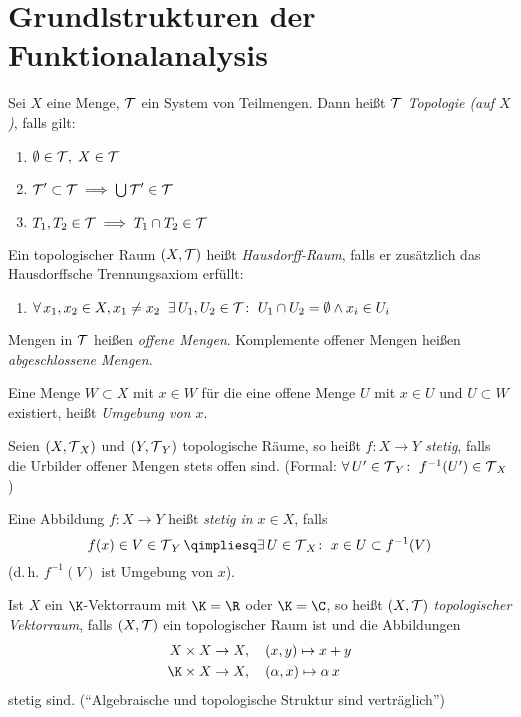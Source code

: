 \chapter{Grundlstrukturen der Funktionalanalysis}
\begin{thEmpty}[Topologie]
    Sei $X$ eine Menge, $\operatorname{\mathcal{T}}$ ein System von Teilmengen. Dann heißt $\operatorname{\mathcal{T}}$
    \emph{Topologie (auf $X$)}, falls gilt:
    \begin{enumerate}[({T}1),leftmargin=2cm]
        \item
            \quad $\emptyset\in\operatorname{\mathcal{T}},\;X\in\operatorname{\mathcal{T}}$
        \item
            \quad $\operatorname{\mathcal{T}}'\subset\operatorname{\mathcal{T}} \implies \bigcup \operatorname{\mathcal{T}}' \in \operatorname{\mathcal{T}}$
        \item
            \quad $T_1,T_2\in\operatorname{\mathcal{T}} \implies T_1\cap T_2\in\operatorname{\mathcal{T}}$
    \end{enumerate}

    Ein topologischer Raum $(X,\operatorname{\mathcal{T}})$ heißt \emph{Hausdorff-Raum}, falls er
    zusätzlich das Hausdorffsche Trennungsaxiom erfüllt:
    \begin{enumerate}[({T}4),leftmargin=2cm]
        \item
            \quad $\forall\, x_1,x_2\in X, x_1\neq x_2\;\; \exists\,
            U_1,U_2\in\operatorname{\mathcal{T}}\colon\; U_1\cap U_2=\emptyset \wedge x_i\in U_i$
    \end{enumerate}

    Mengen in $\operatorname{\mathcal{T}}$ heißen \emph{offene Mengen}. Komplemente offener Mengen heißen
    \emph{abgeschlossene Mengen}.

    Eine Menge $W\subset X$ mit $x\in W$ für die eine offene Menge $U$ mit $x\in U$
    und $U\subset W$ existiert, heißt \emph{Umgebung von $x$}.

    Seien $(X,\operatorname{\mathcal{T}}_X)$ und $(Y,\operatorname{\mathcal{T}}_Y)$ topologische Räume, so heißt 
    \emph{$f\colon X\to Y$ stetig}, falls die Urbilder offener Mengen stets offen sind.
    (Formal: $\forall\,U'\in\operatorname{\mathcal{T}}_Y\colon\; f^{-1}(U')\in\operatorname{\mathcal{T}}_X$)

    Eine Abbildung $f\colon X\to Y$ heißt \emph{stetig in $x\in X$}, falls
    \[ f(x)\in V\in\Topo_Y \qimpliesq \exists\,U\in\Topo_X\colon\; x\in U\subset
        f^{-1}(V)
    \]
    (d.\,h. $f^{-1}(V)$ ist Umgebung von $x$).
\end{thEmpty}

\begin{thEmpty}
    Ist $X$ ein $\K$-Vektorraum mit $\K=\R$ oder $\K=\C$, so heißt $(X,\operatorname{\mathcal{T}})$
    \emph{topologischer Vektorraum}, falls $(X,\operatorname{\mathcal{T}})$ ein topologischer Raum
    ist und die Abbildungen
    \begin{align*}
        X\times X  &\to X, \quad (x,y)\mapsto x+y \\
        \K\times X &\to X, \quad (\alpha,x)\mapsto \alpha \, x
    \end{align*}
    stetig sind. (\enquote{Algebraische und topologische Struktur sind
    verträglich})
\end{thEmpty}

